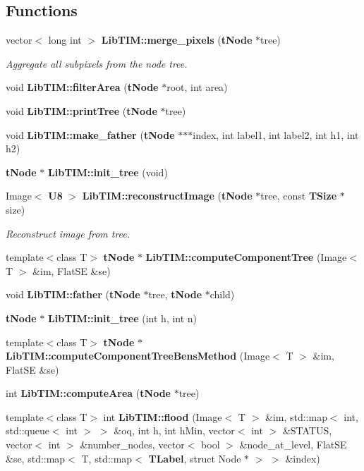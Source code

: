 \subsection*{Functions}
\begin{CompactItemize}
\item 
vector$<$ long int $>$ {\bf Lib\-TIM::merge\_\-pixels} ({\bf t\-Node} $\ast$tree)
\begin{CompactList}\small\item\em Aggregate all subpixels from the node tree. \item\end{CompactList}\item 
void {\bf Lib\-TIM::filter\-Area} ({\bf t\-Node} $\ast$root, int area)
\item 
void {\bf Lib\-TIM::print\-Tree} ({\bf t\-Node} $\ast$tree)
\item 
void {\bf Lib\-TIM::make\_\-father} ({\bf t\-Node} $\ast$$\ast$$\ast$index, int label1, int label2, int h1, int h2)
\item 
{\bf t\-Node} $\ast$ {\bf Lib\-TIM::init\_\-tree} (void)
\item 
Image$<$ {\bf U8} $>$ {\bf Lib\-TIM::reconstruct\-Image} ({\bf t\-Node} $\ast$tree, const {\bf TSize} $\ast$size)
\begin{CompactList}\small\item\em Reconstruct image from tree. \item\end{CompactList}\item 
template$<$class T$>$ {\bf t\-Node} $\ast$ {\bf Lib\-TIM::compute\-Component\-Tree} (Image$<$ T $>$ \&im, Flat\-SE \&se)
\item 
void {\bf Lib\-TIM::father} ({\bf t\-Node} $\ast$tree, {\bf t\-Node} $\ast$child)
\item 
{\bf t\-Node} $\ast$ {\bf Lib\-TIM::init\_\-tree} (int h, int n)
\item 
template$<$class T$>$ {\bf t\-Node} $\ast$ {\bf Lib\-TIM::compute\-Component\-Tree\-Bens\-Method} (Image$<$ T $>$ \&im, Flat\-SE \&se)
\item 
int {\bf Lib\-TIM::compute\-Area} ({\bf t\-Node} $\ast$tree)
\item 
template$<$class T$>$ int {\bf Lib\-TIM::flood} (Image$<$ T $>$ \&im, std::map$<$ int, std::queue$<$ int $>$ $>$ \&oq, int h, int h\-Min, vector$<$ int $>$ \&STATUS, vector$<$ int $>$ \&number\_\-nodes, vector$<$ bool $>$ \&node\_\-at\_\-level, Flat\-SE \&se, std::map$<$ T, std::map$<$ {\bf TLabel}, struct Node $\ast$ $>$ $>$ \&index)

\end{CompactItemize}
